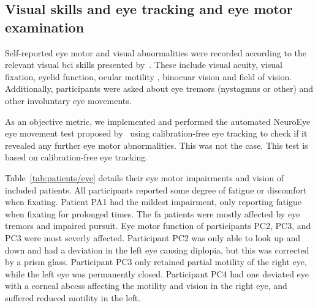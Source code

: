\subsection{Visual skills and eye tracking and eye motor examination}

Self-reported eye motor and visual abnormalities were recorded according to the
relevant visual \ac{bci} skills presented by~\textcite{FriedOken2020}.
These include visual acuity, visual fixation, eyelid function, ocular motility
, binocuar vision and field of vision.
Additionally, participants were asked about eye tremors (nystagmus or other) and
other involuntary eye movements.

As an objective metric, we implemented and performed the automated NeuroEye eye movement
test proposed by~\textcite{Hassan2022} using calibration-free eye tracking to
check if it revealed any further eye motor abnormalities.
This was not the case.
This test is based on calibration-free eye tracking.

Table~\ref{tab:patients/eye} details their eye motor impairments and vision of
included patients.
All participants reported some degree of fatigue or discomfort when fixating.
Patient PA1 had the mildest impairment, only reporting fatigue when fixating
for prolonged times.
The \ac{fa} patients were mostly affected by eye tremors and impaired pursuit.
Eye motor function of participants PC2, PC3, and PC3 were most severly affected.
Participant PC2 was only able to look up and down and had a deviation in the
left eye causing diplopia, but this was corrected by a prism glass.
Participant PC3 only retained partial motility of the right eye, while the left eye was permanently closed.
Participant PC4 had one deviated eye with a corneal abcess affecting the motility
and vision in the right eye, and suffered reduced motility in the left.

\begin{table}[t]
  \centering
  \footnotesize
  
  \caption[Visual skills of the included participants.]{%
  Visual skills of the included participants.
  Visual~\ac{bci} skills~\cite{FriedOken2020}
  was assessed with a combination of self-reported issues
  by the subject and the NeuroEye~\cite{Hassan2022} test. \BigCross\
  impaired, \BigDiamondshape\ severely impaired. Visual acuity in logMAR, lower
  is better.}
  \label{tab:patients/eye}
\end{table}

